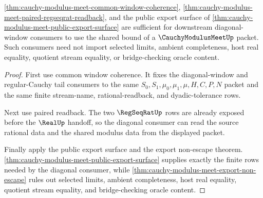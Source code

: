 \begin{theorem}
\label{thm:cauchy-modulus-meet-diagonal-consumer-sufficiency}
\autoref{thm:cauchy-modulus-meet-common-window-coherence}, \autoref{thm:cauchy-modulus-meet-paired-regseqrat-readback}, and the public export surface of \autoref{thm:cauchy-modulus-meet-public-export-surface} are sufficient for downstream diagonal-window consumers to use the shared bound of a $\CauchyModulusMeetUp$ packet. Such consumers need not import selected limits, ambient completeness, host real equality, quotient stream equality, or bridge-checking oracle content.
\end{theorem}
\begin{proof}
First use common window coherence. It fixes the diagonal-window and regular-Cauchy tail consumers to the same $S_0,S_1,\mu_0,\mu_1,\mu,H,C,P,N$ packet and the same finite stream-name, rational-readback, and dyadic-tolerance rows.

Next use paired readback. The two $\RegSeqRatUp$ rows are already exposed before the $\RealUp$ handoff, so the diagonal consumer can read the source rational data and the shared modulus data from the displayed packet.

Finally apply the public export surface and the export non-escape theorem. \autoref{thm:cauchy-modulus-meet-public-export-surface} supplies exactly the finite rows needed by the diagonal consumer, while \autoref{thm:cauchy-modulus-meet-export-non-escape} rules out selected limits, ambient completeness, host real equality, quotient stream equality, and bridge-checking oracle content.
\end{proof}

